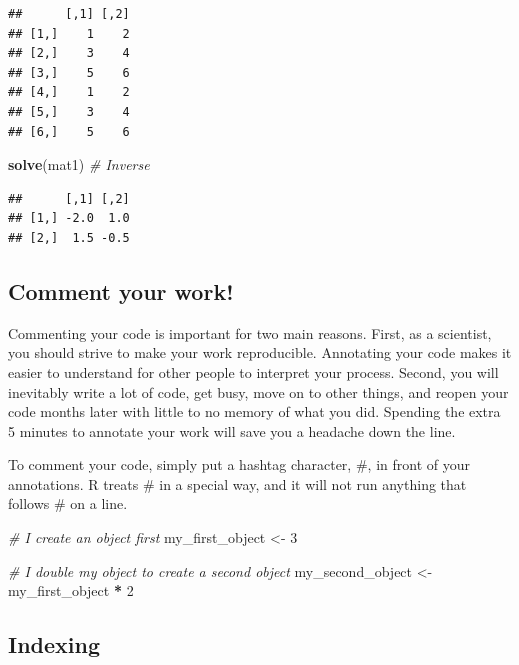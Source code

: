 \documentclass[
]{article}
\newenvironment{Shaded}{\begin{snugshade}}{\end{snugshade}}
\newcommand{\CommentTok}[1]{\textcolor[rgb]{0.56,0.35,0.01}{\textit{#1}}}
\newcommand{\DecValTok}[1]{\textcolor[rgb]{0.00,0.00,0.81}{#1}}
\newcommand{\FunctionTok}[1]{\textcolor[rgb]{0.13,0.29,0.53}{\textbf{#1}}}
\newcommand{\NormalTok}[1]{#1}
\newcommand{\OtherTok}[1]{\textcolor[rgb]{0.56,0.35,0.01}{#1}}
\newcommand{\SpecialCharTok}[1]{\textcolor[rgb]{0.81,0.36,0.00}{\textbf{#1}}}
\begin{document}
\begin{verbatim}
##      [,1] [,2]
## [1,]    1    2
## [2,]    3    4
## [3,]    5    6
## [4,]    1    2
## [5,]    3    4
## [6,]    5    6
\end{verbatim}

\begin{Shaded}
\begin{Highlighting}[]
\FunctionTok{solve}\NormalTok{(mat1) }\CommentTok{\# Inverse}
\end{Highlighting}
\end{Shaded}

\begin{verbatim}
##      [,1] [,2]
## [1,] -2.0  1.0
## [2,]  1.5 -0.5
\end{verbatim}

\subsection{Comment your work!}\label{comment-your-work}

Commenting your code is important for two main reasons. First, as a
scientist, you should strive to make your work reproducible. Annotating
your code makes it easier to understand for other people to interpret
your process. Second, you will inevitably write a lot of code, get busy,
move on to other things, and reopen your code months later with little
to no memory of what you did. Spending the extra 5 minutes to annotate
your work will save you a headache down the line.

To comment your code, simply put a hashtag character, \#, in front of
your annotations. R treats \# in a special way, and it will not run
anything that follows \# on a line.

\begin{Shaded}
\begin{Highlighting}[]
\CommentTok{\# I create an object first}
\NormalTok{my\_first\_object }\OtherTok{\textless{}{-}} \DecValTok{3}


\CommentTok{\# I double my object to create a second object}
\NormalTok{my\_second\_object }\OtherTok{\textless{}{-}}\NormalTok{ my\_first\_object }\SpecialCharTok{*} \DecValTok{2}
\end{Highlighting}
\end{Shaded}

\subsection{Indexing}\label{indexing}
\end{document}
